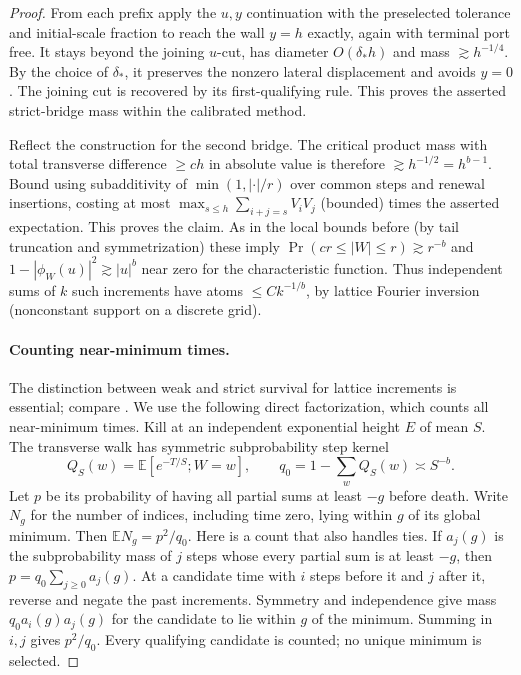 \documentclass[11pt]{article}
\numberwithin{equation}{section}
\theoremstyle{definition}\newtheorem{definition}[theorem]{Definition}
\theoremstyle{remark}\newtheorem{remark}[theorem]{Remark}
\begin{document}
\begin{proof}
From each prefix apply the $u,y$ continuation with the preselected
tolerance and initial-scale fraction to reach the wall $y=h$ exactly,
again with terminal port free. It stays beyond the joining $u$-cut,
has diameter $O(\delta_*h)$ and mass $\gtrsim h^{-1/4}$. By the choice
of $\delta_*$, it preserves the nonzero lateral displacement and avoids
$y=0$. The joining cut is recovered by its first-qualifying rule. This
proves the asserted strict-bridge mass within the calibrated method.

Reflect the construction for the second bridge. The critical product mass with total transverse difference $\ge ch$ in absolute value is therefore $\gtrsim h^{-1/2}=h^{b-1}$. Bound using subadditivity of \(\min(1,|\cdot|/r)\) over common steps and renewal insertions, costing at most \(\max_{s\le h}\sum_{i+j=s}V_i V_j\) (bounded) times the asserted expectation. This proves the claim. As in the local bounds before (by tail truncation and symmetrization) these imply \(\Pr(c r\le |W|\le r)\gtrsim r^{-b}\) and \(1-|\phi_W(u)|^2\gtrsim |u|^b\) near zero for the characteristic function. Thus independent sums of \(k\) such increments have atoms \(\le C k^{-1/b}\), by lattice Fourier inversion (nonconstant support on a discrete grid).

\paragraph{Counting near-minimum times.}
The distinction between weak and strict survival for lattice increments
is essential; compare \cite[Section 2.2]{Vysotsky2014}. We use the
following direct factorization, which counts all near-minimum times.
Kill at an independent exponential height $E$ of mean $S$. The transverse
walk has symmetric subprobability step kernel
\[
 Q_S(w)=\mathbb E[e^{-T/S};W=w],\qquad
 q_0=1-\sum_wQ_S(w)\asymp S^{-b}.
\]
Let $p$ be its probability of having all partial sums at least $-g$
before death. Write $N_g$ for the number of indices, including time zero,
lying within
$g$ of its global minimum. Then $\mathbb E N_g=p^2/q_0$. Here is a count that
also handles ties. If $a_j(g)$ is the subprobability mass of $j$ steps
whose every partial sum is at least $-g$, then
$p=q_0\sum_{j\ge0}a_j(g)$. At a candidate time with $i$ steps before
it and $j$ after it, reverse and negate the past increments. Symmetry
and independence give mass $q_0a_i(g)a_j(g)$ for the candidate to lie
within $g$ of the minimum. Summing in $i,j$ gives $p^2/q_0$.
Every qualifying candidate is counted; no unique minimum is selected.


\end{proof}
\end{document}
